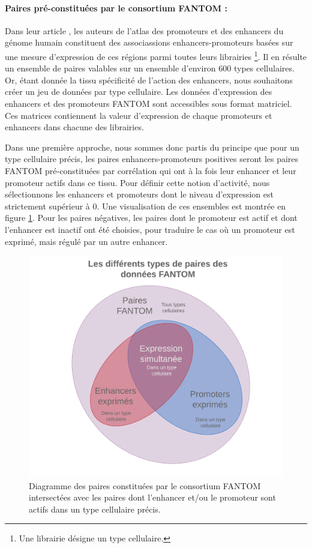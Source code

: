\documentclass[french]{llncs}
\begin{document}
\paragraph{Paires pré-constituées par le consortium FANTOM :}

Dans leur article \cite{the_fantom_consortium_atlas_2014}, les auteurs de l'atlas des promoteurs et des enhancers du génome humain constituent des associassions enhancers-promoteurs basées sur une mesure d'expression de ces régions parmi toutes leurs librairies \footnote{Une librairie désigne un type cellulaire.}. Il en résulte un ensemble de paires valables sur un ensemble d'environ 600 types cellulaires. Or, étant donnée la tissu spécificité de l'action des enhancers, nous souhaitons créer un jeu de données par type cellulaire. Les données d'expression des enhancers et des promoteurs FANTOM sont accessibles sous format matriciel. Ces matrices contiennent la valeur d'expression de chaque promoteurs et enhancers dans chacune des librairies.

Dans une première approche, nous sommes donc partis du principe que pour un type cellulaire précis, les paires enhancers-promoteurs positives seront les paires FANTOM pré-constituées par corrélation qui ont à la fois leur enhancer et leur promoteur actifs dans ce tissu. Pour définir cette notion d'activité, nous sélectionnons les enhancers et promoteurs dont le niveau d'expression est strictement supérieur à 0. Une visualisation de ces ensembles est montrée en figure \ref{fig/paires_fantom}. Pour les paires négatives, les paires dont le promoteur est actif et dont l'enhancer est inactif ont été choisies, pour traduire le cas où un promoteur est exprimé, mais régulé par un autre enhancer. 

\begin{figure}[h]
\begin{center}
 	\includegraphics[width=0.7\linewidth]{Images/FANTOM_pairs.png}
 \caption{Diagramme des paires constituées par le consortium FANTOM intersectées avec les paires dont l'enhancer et/ou le promoteur sont actifs dans un type cellulaire précis.} \label{fig/paires_fantom}
\end{center}
\end{figure}
\end{document}

